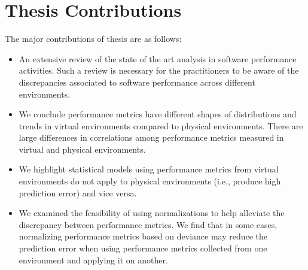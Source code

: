 
\section{Thesis Contributions}

The major contributions of thesis are as follows:

\begin{itemize}
	\item An extensive review of the state of the art analysis in software performance activities. Such a review is necessary for the practitioners to be aware of the discrepancies associated to software performance across different environments.
	
	\item We conclude performance metrics have different shapes of distributions and trends in virtual environments compared to physical environments. There are large differences in correlations among performance metrics measured in virtual and physical environments.
	\item We highlight statistical models using performance metrics from virtual environments do not apply to physical environments (i.e., produce high prediction error) and vice versa.
	\item  We examined the feasibility of using normalizations to help alleviate the discrepancy between performance metrics. We find that in some cases, normalizing performance metrics based on deviance may reduce the prediction error when using performance metrics collected from one environment and applying it on another. 
\end{itemize}